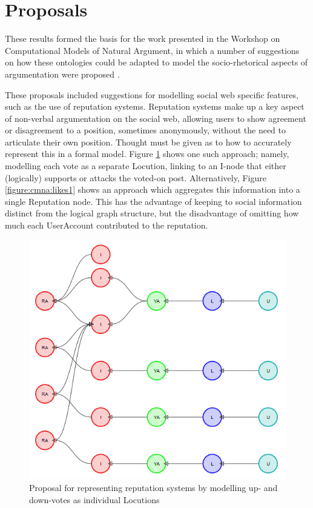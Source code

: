 \newcommand{\scaleProps}{0.7}

\section{Proposals}
\label{investigation:proposals}
These results formed the basis for the work presented in the Workshop on Computational Models of Natural Argument, in which a number of suggestions on how these ontologies could be adapted to model the socio-rhetorical aspects of argumentation were proposed \citep{Blount2014}.

These proposals included suggestions for modelling social web specific features, such as the use of reputation systems. Reputation systems make up a key aspect of non-verbal argumentation on the social web, allowing users to show agreement or disagreement to a position, sometimes anonymously, without the need to articulate their own position. Thought must be given as to how to accurately represent this in a formal model. Figure \ref{figure:cmna:likes2} shows one such approach; namely, modelling each vote as a separate Locution, linking to an I-node that either (logically) supports or attacks the voted-on post. Alternatively, Figure \ref{figure:cmna:likes1} shows an approach which aggregates this information into a single Reputation node. This has the advantage of keeping to social information distinct from the logical graph structure, but the disadvantage of omitting how much each UserAccount contributed to the reputation.


\begin{figure}
\centering
\includegraphics[scale=\scaleProps]{./figures/cmna_proposals/likes2.png}
\caption{Proposal for representing reputation systems by modelling up- and down-votes as individual Locutions}
\label{figure:cmna:likes2}
\end{figure}

